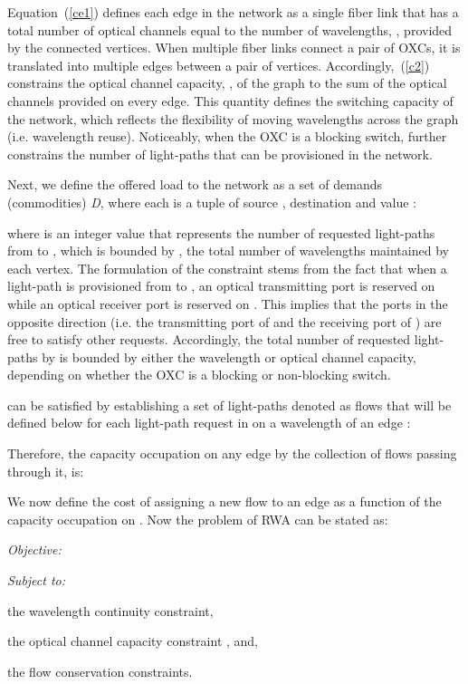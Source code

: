\documentclass[journal]{IEEEtran}
\begin{document}
Equation~(\ref{ce1}) defines each edge in the network as a
single fiber link that has a total number of optical channels equal to the number of
wavelengths, , provided by the connected vertices. When multiple fiber links connect a
pair of OXCs, it is translated into multiple edges between a pair of vertices.
Accordingly,~(\ref{c2}) constrains the optical channel capacity, , of the graph to the sum of the optical channels provided on every edge. This quantity defines the switching capacity of the network, which reflects the flexibility of moving wavelengths across the graph (i.e. wavelength reuse). 
Noticeably, when the OXC is a blocking switch,  further constrains the number of light-paths that can be provisioned in the network.

Next, we define the offered load to the network as a set of demands (commodities)
\textit{D}, where each  is a tuple of source , destination  and value : 
 
where  is an integer value that represents the number of
requested light-paths from  to , which is bounded by , the total number of
wavelengths maintained by each vertex. The formulation of the constraint stems from the fact that when a light-path is provisioned from  to , an optical transmitting port is reserved on  while an optical receiver port is reserved on . This implies that the ports in the opposite direction (i.e. the transmitting port of  and the receiving port of ) are free to satisfy other requests. Accordingly, the total number of requested light-paths by  is bounded by either the wavelength or optical channel capacity, depending on whether the OXC is a blocking or non-blocking switch.

 can be satisfied by establishing a set of light-paths denoted as flows  that will be defined below for each light-path request in  on a wavelength  of an edge :
 
 Therefore, the capacity occupation on any edge  by the collection
 of flows passing through it, is:
 
We now define the cost of assigning a new flow to an edge  as a function  of the capacity occupation on . Now the problem of RWA can be stated as:

\emph{Objective:}
 
\emph{ Subject to:}
 \begin{inparaenum} \item the wavelength continuity constraint, 
 \item the optical channel capacity constraint , and,
 \item the flow conservation constraints.
 \end{inparaenum} 
 
\end{document}
